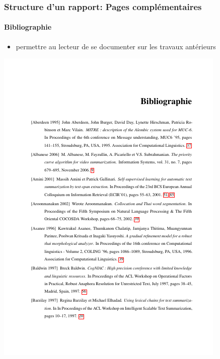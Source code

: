 \documentclass[xcolor=table]{beamer}
\begin{document}
\begin{frame}
\frametitle{Structure d'un rapport: Pages complémentaires}
\framesubtitle{Bibliographie}

\begin{minipage}{0.52\textwidth}
	\begin{itemize}
		\item permettre au lecteur de se documenter sur les travaux antérieurs
	\end{itemize}
\end{minipage}
\begin{minipage}{0.42\textwidth}
	\includegraphics[width=\textwidth]{..//img/Bweb03-redaction/bibliographie.png}
\end{minipage}

\end{frame}
\end{document}
